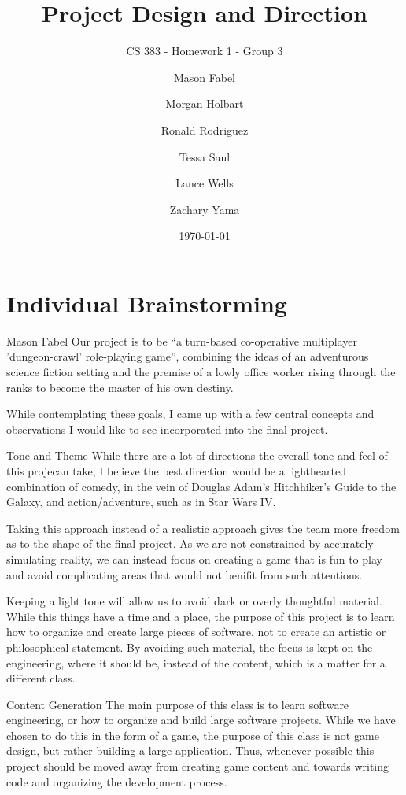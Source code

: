 \documentclass[12pt]{report}
\title{Project Design and Direction}
\subtitle{CS 383 - Homework 1 - Group 3}
\author{
Mason Fabel \\
\and Morgan Holbart \\
\and Ronald Rodriguez \\
\and Tessa Saul \\
\and Lance Wells \\
\and Zachary Yama \\
}
\date{\today}
\begin{document}
\maketitle

\chapter{Individual Brainstorming}

\begin{section}{Mason Fabel}
Our project is to be ``a turn-based co-operative multiplayer
'dungeon-crawl' role-playing game'', combining the ideas of an adventurous
science fiction setting and the premise of a lowly office worker rising
through the ranks to become the master of his own destiny.

While contemplating these goals, I came up with a few central concepts and
observations I would like to see incorporated into the final project.

\begin{subsection}{Tone and Theme}
While there are a lot of directions the overall tone and feel of this
projecan take, I believe the best direction would be a lighthearted
combination of comedy, in the vein of Douglas Adam's Hitchhiker's Guide to
the Galaxy, and action/adventure, such as in Star Wars IV.

Taking this approach instead of a realistic approach gives the team more
freedom as to the shape of the final project. As we are not constrained by
accurately simulating reality, we can instead focus on creating a game that
is fun to play and avoid complicating areas that would not benifit from
such attentions.

Keeping a light tone will allow us to avoid dark or overly thoughtful
material. While this things have a time and a place, the purpose
of this project is to learn how to organize and create large pieces of
software, not to create an artistic or philosophical statement. By avoiding
such material, the focus is kept on the engineering, where it should be,
instead of the content, which is a matter for a different class.
\end{subsection}

\begin{subsection}{Content Generation}
The main purpose of this class is to learn software engineering, or how
to organize and build large software projects. While we have chosen to do
this in the form of a game, the purpose of this class is not game design,
but rather building a large application. Thus, whenever possible this
project should be moved away from creating game content and towards writing
code and organizing the development process.


\end{subsection}
\end{section}
\end{document}
